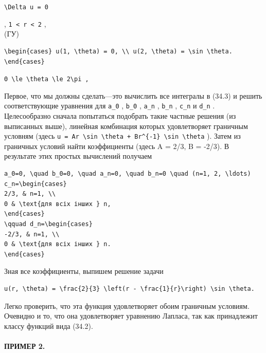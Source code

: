 \documentclass[
  ukrainian,
]{article}
\begin{document}
\texttt{\textbackslash{}Delta\ u\ =\ 0}

, \texttt{1\ \textless{}\ r\ \textless{}\ 2} ,\\
(ГУ)

\begin{verbatim}
\begin{cases} u(1, \theta) = 0, \\ u(2, \theta) = \sin \theta. \end{cases}
\end{verbatim}

\texttt{\textquotesingle{}0\ \textbackslash{}le\ \textbackslash{}theta\ \textbackslash{}le\ 2\textbackslash{}pi\textquotesingle{}\ ,}

Первое, что мы должны сделать---это вычислить все интегралы в (34.3) и
решить соответствующие уравнения для \texttt{a\_0} , \texttt{b\_0} ,
\texttt{a\_n} , \texttt{b\_n} , \texttt{c\_n} и \texttt{d\_n} .
Целесообразно сначала попытаться подобрать такие частные решения (из
выписанных выше), линейная комбинация которых удовлетворяет граничным
условням (здесь
\texttt{u\ =\ Ar\ \textbackslash{}sin\ \textbackslash{}theta\ +\ Br\^{}\{-1\}\ \textbackslash{}sin\ \textbackslash{}theta}
). Затем из граничных условий найти коэффициенты (здесь A = 2/3, B =
-2/3). В результате этих простых вычислений получаем

\begin{verbatim}
a_0=0, \quad b_0=0, \quad a_n=0, \quad b_n=0 \quad (n=1, 2, \ldots)
c_n=\begin{cases}
2/3, & n=1, \\
0 & \text{для всіх інших } n,
\end{cases}
\qquad d_n=\begin{cases}
-2/3, & n=1, \\
0 & \text{для всіх інших } n.
\end{cases}
\end{verbatim}

Зная все коэффициенты, выпишем решение задачи

\begin{verbatim}
u(r, \theta) = \frac{2}{3} \left(r - \frac{1}{r}\right) \sin \theta.
\end{verbatim}

Легко проверить, что эта функция удовлетворяет обоим граничным условиям.
Очевидно и то, что она удовлетворяет уравнению Лапласа, так как
принадлежит классу функций вида (34.2).

\paragraph{ПРИМЕР 2.}\label{ux43fux440ux438ux43cux435ux440-2.}
\end{document}
